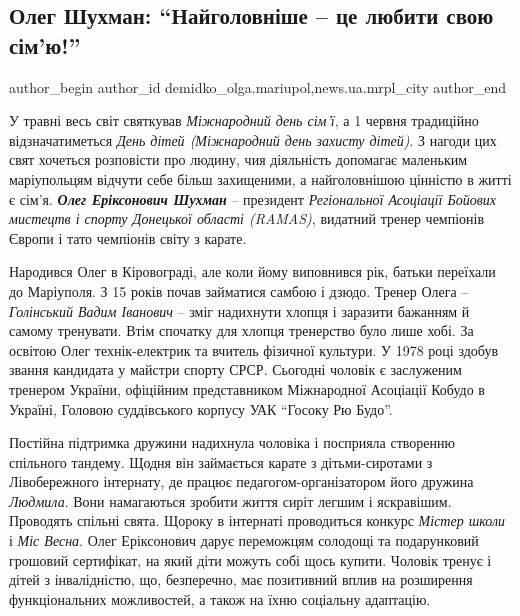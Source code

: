  
 
 
 
 
 
\subsection{Олег Шухман: \enquote{Найголовніше – це любити свою сім'ю!}}
\label{sec:27_05_2020.stz.news.ua.mrpl_city.1.oleg_shuhman}
 
\ifcmt
 author_begin
   author_id demidko_olga.mariupol,news.ua.mrpl_city
 author_end
\fi

У травні весь світ святкував \emph{Міжнародний день сім'ї}, а 1 червня традиційно
відзначатиметься \emph{День дітей (Міжнародний день захисту дітей)}. З нагоди цих свят
хочеться розповісти про людину, чия діяльність допомагає маленьким маріупольцям
відчути себе більш захищеними, а найголовнішою цінністю в житті є сім'я. \emph{\textbf{Олег
Еріксонович Шухман}} – президент \emph{Регіональної Асоціації Бойових мистецтв і спорту
Донецької області (RAMAS)}, видатний тренер чемпіонів Європи і тато чемпіонів
світу з карате.


Народився Олег в Кіровограді, але коли йому виповнився рік, батьки переїхали до
Маріуполя. З 15 років почав займатися самбою і дзюдо. Тренер Олега – \emph{Голінський
Вадим Іванович} – зміг надихнути хлопця і заразити бажанням й самому тренувати.
Втім спочатку для хлопця тренерство було лише хобі. За освітою Олег
технік-електрик та вчитель фізичної культури. У 1978 році здобув звання
кандидата у майстри спорту СРСР. Сьогодні чоловік є заслуженим тренером
України, офіційним представником Міжнародної Асоціації Кобудо в Україні,
Головою суддівського корпусу УАК \enquote{Госоку Рю Будо}. 

Постійна підтримка дружини надихнула чоловіка і посприяла створенню спільного
тандему. Щодня він займається карате з дітьми-сиротами з Лівобережного
інтернату, де працює педагогом-організатором його дружина \emph{Людмила}. Вони
намагаються зробити життя сиріт легшим і яскравішим. Проводять спільні свята.
Щороку в інтернаті проводиться конкурс \emph{Містер школи} і \emph{Міс Весна}. Олег
Еріксонович дарує переможцям солодощі та подарунковий грошовий сертифікат, на
який діти можуть собі щось купити. Чоловік тренує і дітей з інвалідністю, що,
безперечно, має позитивний вплив на розширення функціональних можливостей, а
також на їхню соціальну адаптацію.

